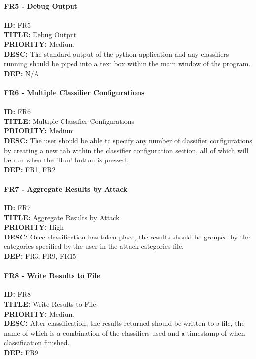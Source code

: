 \paragraph*{FR5 - Debug Output}
\textbf{ID:} FR5 \\
\textbf{TITLE:} Debug Output \\
\textbf{PRIORITY:} Medium \\
\textbf{DESC:} The standard output of the python application and any classifiers running should be piped into a text box within the main window of the program. \\
\textbf{DEP:} N/A
\paragraph*{FR6 - Multiple Classifier Configurations}
\textbf{ID:} FR6 \\
\textbf{TITLE:} Multiple Classifier Configurations \\
\textbf{PRIORITY:} Medium \\
\textbf{DESC:} The user should be able to specify any number of classifier configurations by creating a new tab within the classifier configuration section, all of which will be run when the 'Run' button is pressed. \\
\textbf{DEP:} FR1, FR2
\paragraph*{FR7 - Aggregate Results by Attack}
\textbf{ID:} FR7 \\
\textbf{TITLE:} Aggregate Results by Attack \\
\textbf{PRIORITY:} High \\
\textbf{DESC:} Once classification has taken place, the results should be grouped by the categories specified by the user in the attack categories file. \\
\textbf{DEP:} FR3, FR9, FR15
\paragraph*{FR8 - Write Results to File}
\textbf{ID:} FR8 \\
\textbf{TITLE:} Write Results to File \\
\textbf{PRIORITY:} Medium \\
\textbf{DESC:} After classification, the results returned should be written to a file, the name of which is a combination of the classifiers used and a timestamp of when classification finished. \\
\textbf{DEP:} FR9

